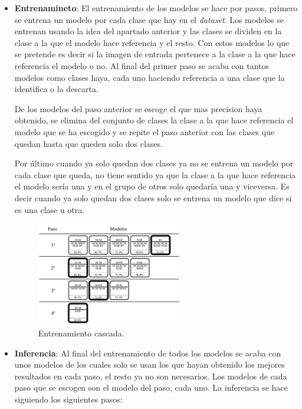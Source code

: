 \documentclass[12pt,a4paper]{article}
\begin{document}
\begin{itemize}

\item \textbf{Entrenamineto}: El entrenamiento de los modelos se hace por pasos, primero se entrena un modelo por cada clase que hay en el \textit{dataset}. Los modelos se entrenan usando la idea del apartado anterior y las clases se dividen en la clase a la que el modelo hace referencia y el resto. Con estos modelos lo que se pretende es decir si la imagen de entrada pertenece a la clase a la que hace referencia el modelo o no. Al final del primer paso se acaba con tantos modelos como clases haya, cada uno haciendo referencia a una clase que la identifica o la descarta.
\bigskip

De los modelos del paso anterior se escoge el que mas precision haya obtenido, se elimina del conjunto de clases la clase a la que hace referencia el modelo que se ha escogido y se repite el paso anterior con las clases que quedan hasta que queden solo dos clases.
\bigskip

Por último cuando ya solo quedan dos clases ya no se entrena un modelo por cada clase que queda, no tiene sentido ya que la clase a la que hace referencia el modelo sería una y en el grupo de otros solo quedaría una y viceversa. Es decir cuando ya solo quedan dos clases solo se entrena un modelo que dice si es una clase u otra.

\begin{figure}[H]
\centering
\includegraphics[width=0.6\textwidth]{img/entrenamiento_cascada}
\caption{Entrenamiento cascada.}
\end{figure}

\item \textbf{Inferencia}: Al final del entrenamiento de todos los modelos se acaba con unos modelos de los cuales solo se usan los que hayan obtenido los mejores resultados en cada paso, el resto ya no son necesarios. Los modelos de cada paso que se escogen son el modelo del paso, cada uno. La inferencia se hace siguiendo los siguientes pasos:


\end{itemize}
\end{document}

